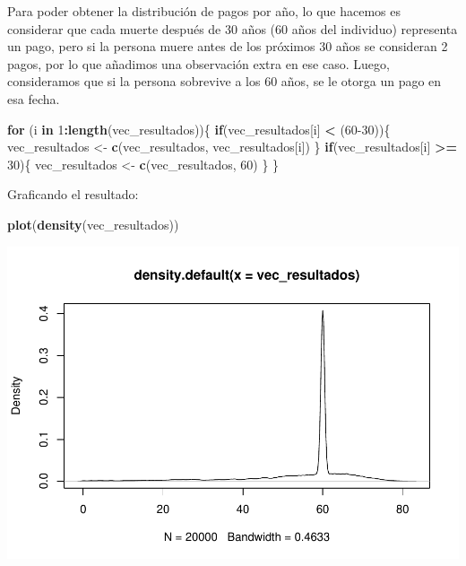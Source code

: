 \documentclass[
]{article}
\newenvironment{Shaded}{\begin{snugshade}}{\end{snugshade}}
\newcommand{\ControlFlowTok}[1]{\textcolor[rgb]{0.13,0.29,0.53}{\textbf{#1}}}
\newcommand{\DecValTok}[1]{\textcolor[rgb]{0.00,0.00,0.81}{#1}}
\newcommand{\FunctionTok}[1]{\textcolor[rgb]{0.13,0.29,0.53}{\textbf{#1}}}
\newcommand{\NormalTok}[1]{#1}
\newcommand{\OtherTok}[1]{\textcolor[rgb]{0.56,0.35,0.01}{#1}}
\newcommand{\SpecialCharTok}[1]{\textcolor[rgb]{0.81,0.36,0.00}{\textbf{#1}}}
\begin{document}
Para poder obtener la distribución de pagos por año, lo que hacemos es
considerar que cada muerte después de 30 años (60 años del individuo)
representa un pago, pero si la persona muere antes de los próximos 30
años se consideran 2 pagos, por lo que añadimos una observación extra en
ese caso. Luego, consideramos que si la persona sobrevive a los 60 años,
se le otorga un pago en esa fecha.

\begin{Shaded}
\begin{Highlighting}[]
\ControlFlowTok{for}\NormalTok{ (i }\ControlFlowTok{in} \DecValTok{1}\SpecialCharTok{:}\FunctionTok{length}\NormalTok{(vec\_resultados))\{}
  \ControlFlowTok{if}\NormalTok{(vec\_resultados[i] }\SpecialCharTok{\textless{}}\NormalTok{ (}\DecValTok{60{-}30}\NormalTok{))\{}
\NormalTok{    vec\_resultados }\OtherTok{\textless{}{-}} \FunctionTok{c}\NormalTok{(vec\_resultados, vec\_resultados[i])}
\NormalTok{  \}}
  \ControlFlowTok{if}\NormalTok{(vec\_resultados[i] }\SpecialCharTok{\textgreater{}=} \DecValTok{30}\NormalTok{)\{}
\NormalTok{    vec\_resultados }\OtherTok{\textless{}{-}} \FunctionTok{c}\NormalTok{(vec\_resultados, }\DecValTok{60}\NormalTok{)}
\NormalTok{  \}}
\NormalTok{\}}
\end{Highlighting}
\end{Shaded}

Graficando el resultado:

\begin{Shaded}
\begin{Highlighting}[]
\FunctionTok{plot}\NormalTok{(}\FunctionTok{density}\NormalTok{(vec\_resultados))}
\end{Highlighting}
\end{Shaded}

\includegraphics{tarea2_files/figure-latex/unnamed-chunk-10-1.pdf}
\end{document}

